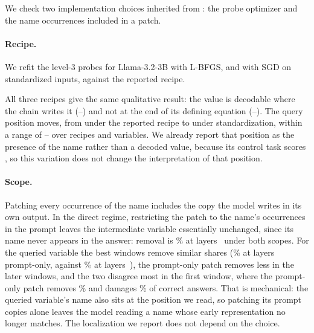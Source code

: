 \label{app:recipe}

We check two implementation choices inherited from \citet{kudo2026faithful}: the probe optimizer and the name occurrences included in a patch.

\paragraph{Recipe.} We refit the level-3 probes for Llama-3.2-3B with L-BFGS, and with SGD on
standardized inputs, against the reported recipe.

\begin{table}[t]
\centering\small
{}
\ifdim\wd\appendixtablebox>\textwidth
\resizebox{\textwidth}{!}{\usebox{\appendixtablebox}}
\else\usebox{\appendixtablebox}\fi
\caption{Best-layer true-value accuracy on neutral problems under three probe recipes
(proportions from 0 to 1).}
\label{tab:recipe}
\end{table}

All three recipes give the same qualitative result: the value is decodable where the chain writes it
(--) and not at the end of its defining equation
(--). The query position moves, from 
under the reported recipe to  under standardization, within a range of
-- over recipes and variables. We already report that
position as the presence of the name rather than a decoded value, because its control task
scores , so this variation does not change the interpretation of that position.

\paragraph{Scope.} Patching every occurrence of the name includes the copy the model writes in
its own output. In the direct regime, restricting the patch to the name's occurrences in the prompt leaves the
intermediate variable essentially unchanged, since its name never appears in the answer: removal is
\% at layers~ under both scopes. For the queried
variable the best windows remove similar shares (\% at
layers~ prompt-only, against \% at
layers~), the prompt-only patch removes less in the later windows, and the
two disagree most in the first window, where the prompt-only patch removes
\% and damages \% of correct answers. That
is mechanical: the queried variable's name also sits at the position we read, so patching its
prompt copies alone leaves the model reading a name whose early representation no longer
matches. The localization we report does not depend on the choice.

